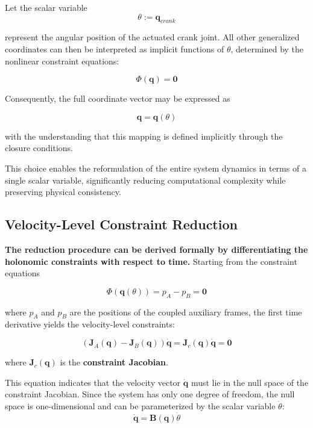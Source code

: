 Let the scalar variable
\begin{equation}
\theta := \textbf{q}_{crank}
\end{equation}

represent the angular position of the actuated crank joint. All other generalized coordinates can then be interpreted as implicit functions of $\theta$, determined by the nonlinear constraint equations:

\begin{equation}
\Phi(\textbf{q}) = \textbf{0}
\end{equation}

Consequently, the full coordinate vector may be expressed as

\begin{equation}
\textbf{q} = \textbf{q}(\theta)
\end{equation}

with the understanding that this mapping is defined implicitly through the closure conditions.

This choice enables the reformulation of the entire system dynamics in terms of a single scalar variable, significantly reducing computational complexity while preserving physical consistency.


\subsection{Velocity-Level Constraint Reduction}
\textbf{The reduction procedure can be derived formally by differentiating the holonomic constraints with respect to time.} Starting from the constraint equations

\begin{equation}
\Phi(\textbf{q}(\theta)) = \textit{p}_A - \textit{p}_B = \textbf{0}
\end{equation}

where $\textit{p}_A$ and $\textit{p}_B$ are the positions of the coupled auxiliary frames, the first time derivative yields the velocity-level constraints:

\begin{equation}
(\textbf{J}_A(\textbf{q}) - \textbf{J}_B(\textbf{q}))\dot{\textbf{q}} = \textbf{J}_c(\textbf{q})\dot{\textbf{q}} = \textbf{0}
\end{equation}

where $\textbf{J}_c(\textbf{q})$ is the \textbf{constraint Jacobian}. 

This equation indicates that the velocity vector $\dot{\textbf{q}}$ must lie in the null space of the constraint Jacobian. Since the system has only one degree of freedom, the null space is one-dimensional and can be parameterized by the scalar variable $\dot{\theta}$:
\begin{equation}
\dot{\textbf{q}} = \textbf{B}(\textbf{q})\dot{\theta}
\end{equation}  


